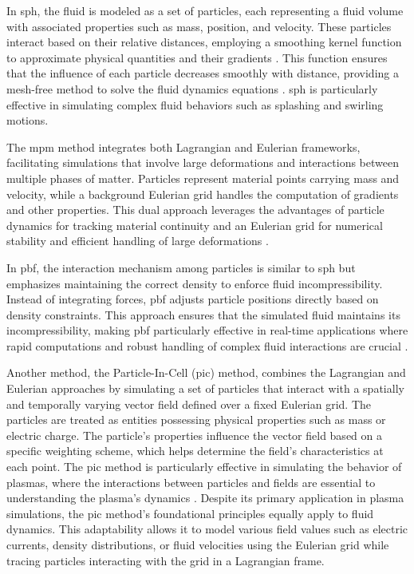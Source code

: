 In \acrshort{sph}, the fluid is modeled as a set of particles, each representing a fluid volume with associated properties such as mass, position, and velocity. These particles interact based on their relative distances, employing a smoothing kernel function to approximate physical quantities and their gradients \cite{sph}. This function ensures that the influence of each particle decreases smoothly with distance, providing a mesh-free method to solve the fluid dynamics equations \cite{sphEq}. \acrshort{sph} is particularly effective in simulating complex fluid behaviors such as splashing and swirling motions. \paraend

The \acrshort{mpm} method integrates both Lagrangian and Eulerian frameworks, facilitating simulations that involve large deformations and interactions between multiple phases of matter. Particles represent material points carrying mass and velocity, while a background Eulerian grid handles the computation of gradients and other properties. This dual approach leverages the advantages of particle dynamics for tracking material continuity and an Eulerian grid for numerical stability and efficient handling of large deformations \cite{mpm}. \paraend

In \acrshort{pbf}, the interaction mechanism among particles is similar to \acrshort{sph} but emphasizes maintaining the correct density to enforce fluid incompressibility. Instead of integrating forces, \acrshort{pbf} adjusts particle positions directly based on density constraints. This approach ensures that the simulated fluid maintains its incompressibility, making \acrshort{pbf} particularly effective in real-time applications where rapid computations and robust handling of complex fluid interactions are crucial \cite{pbf}. \paraend

Another method, the Particle-In-Cell (\acrshort{pic}) method, combines the Lagrangian and Eulerian approaches by 
simulating a set of particles that interact with a spatially and temporally varying vector field defined over a fixed Eulerian grid. 
The particles are treated as entities possessing physical properties such as mass or electric charge. The particle's properties influence the vector field based on a specific weighting scheme, which helps determine the field's characteristics at each point.
The \acrshort{pic} method is particularly effective in simulating the behavior of plasmas, where the interactions between particles and fields are essential to understanding the plasma's dynamics \cite{pic}.
Despite its primary application in plasma simulations, the \acrshort{pic} method's foundational principles equally apply to fluid dynamics. This adaptability allows it to model various field values such as electric currents, density distributions, or fluid velocities using the Eulerian grid while tracing particles interacting with the grid in a Lagrangian frame. 
\paraend

